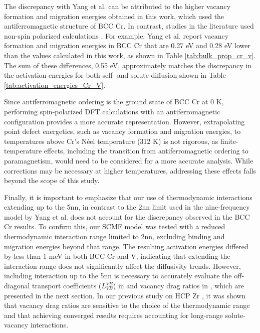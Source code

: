\documentclass[preprint,12pt]{elsarticle}
\begin{document}
The discrepancy with Yang et al. \cite{yang_significant_2023} can be attributed to the higher vacancy formation and migration energies obtained in this work, which used the antiferromagnetic structure of BCC Cr. In contrast, studies in the literature used non-spin polarized calculations \citep{yang_significant_2023,nguyen_bcc_2006,SHANG2016128,fattahpour_understanding_2022}. For example, Yang et al. report vacancy formation and migration energies in BCC Cr that are 0.27 eV and 0.28 eV lower than the values calculated in this work, as shown in Table \ref{tab:bulk_prop_cr_v}. The sum of these differences, 0.55 eV, approximately matches the discrepancy in the activation energies for both self- and solute diffusion shown in Table \ref{tab:activation_energies_Cr_V}.

Since antiferromagnetic ordering is the ground state of BCC Cr at 0 K, performing spin-polarized DFT calculations with an antiferromagnetic configuration provides a more accurate representation. However, extrapolating point defect energetics, such as vacancy formation and migration energies, to temperatures above Cr's Néel temperature (312 K) \citep{bacon1969magnetic} is not rigorous, as finite-temperature effects, including the transition from antiferromagnetic ordering to paramagnetism, would need to be considered for a more accurate analysis. While corrections may be necessary at higher temperatures, addressing these effects falls beyond the scope of this study.

Finally, it is important to emphasize that our use of thermodynamic interactions extending up to the 5nn, in contrast to the 2nn limit used in the nine-frequency model by Yang et al. \cite{yang_significant_2023} does not account for the discrepancy observed in the BCC Cr results. To confirm this, our SCMF model was tested with a reduced thermodynamic interaction range limited to 2nn, excluding binding and migration energies beyond that range. The resulting activation energies differed by less than 1 meV in both BCC Cr and V, indicating that extending the interaction range does not significantly affect the diffusivity trends. However, including interaction up to the 5nn is necessary to accurately evaluate the off-diagonal transport coefficients ($L_{VB}^{VB}$) in  and vacancy drag ratios in , which are presented in the next section. In our previous study on HCP Zr \cite{shousha2024first} , it was shown that vacancy drag ratios are sensitive to the choice of the thermodynamic range and that achieving converged results requires accounting for long-range solute-vacancy interactions.
\end{document}

